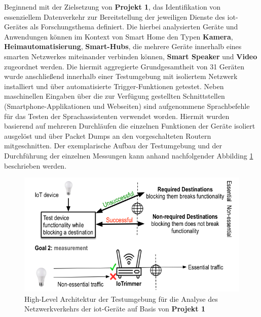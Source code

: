 \noindent Beginnend mit der Zielsetzung von \textbf{Projekt 1}, das Identifikation von essenziellem Datenverkehr zur Bereitstellung der jeweiligen Dienste des \ac{iot}-Gerätes als Forschungsthema definiert. Die hierbei analysierten Geräte und Anwendungen können im Kontext von Smart Home den Typen \textbf{Kamera}, \textbf{Heimautomatisierung}, \textbf{Smart-Hubs}, die mehrere Geräte innerhalb eines smarten Netzwerkes miteinander verbinden können, \textbf{Smart Speaker} und \textbf{Video} zugeordnet werden. Die hiermit aggregierte Grundgesamtheit von 31 Geräten wurde anschließend innerhalb einer Testumgebung mit isoliertem Netzwerk installiert und über automatisierte Trigger-Funktionen getestet. Neben maschinellen Eingaben über die zur Verfügung gestellten Schnittstellen (Smartphone-Applikationen und Webseiten) sind aufgenommene Sprachbefehle für das Testen der Sprachassistenten verwendet worden. Hiermit wurden basierend auf mehreren Durchläufen die einzelnen Funktionen der Geräte isoliert ausgelöst und über Packet Dumps an den vorgeschalteten Routern mitgeschnitten.
Der exemplarische Aufbau der Testumgebung und der Durchführung der einzelnen Messungen kann anhand nachfolgender Abbilding \ref{fig:test-setup-proj1} beschrieben werden.
\begin{figure}
    \centering
    \includegraphics[scale=0.4]{main/pictures/countermeasures/IoTrimmer_IoTrigger}
    \caption{High-Level Architektur der Testumgebung für die Analyse des Netzwerkverkehrs der \ac{iot}-Geräte auf Basis von \textbf{Projekt 1} \cite{Mandalari2021}}
    \label{fig:test-setup-proj1}
\end{figure}

